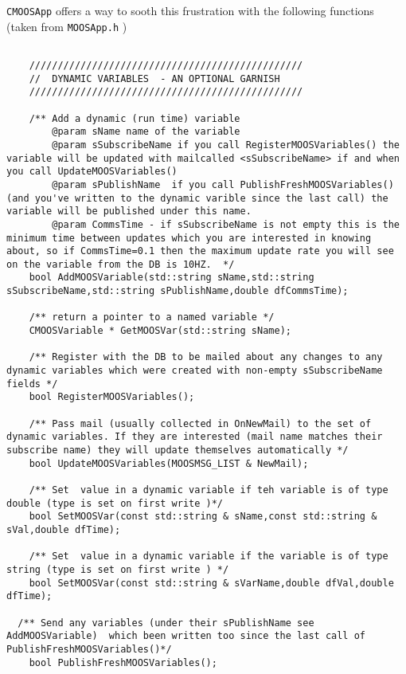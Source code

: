 \documentclass[a4paper,10pt]{article}
\newcommand{\Code}[1]{\texttt{#1} }
\newcommand{\code}[1]{\Code{#1} }
\begin{document}
\code{CMOOSApp} offers a way to sooth this frustration with the following functions (taken from \code{MOOSApp.h})

\begin{lstlisting}

    ////////////////////////////////////////////////
    //  DYNAMIC VARIABLES  - AN OPTIONAL GARNISH
    ////////////////////////////////////////////////

    /** Add a dynamic (run time) variable
        @param sName name of the variable
        @param sSubscribeName if you call RegisterMOOSVariables() the variable will be updated with mailcalled <sSubscribeName> if and when you call UpdateMOOSVariables()
        @param sPublishName  if you call PublishFreshMOOSVariables() (and you've written to the dynamic varible since the last call) the variable will be published under this name.
        @param CommsTime - if sSubscribeName is not empty this is the minimum time between updates which you are interested in knowing about, so if CommsTime=0.1 then the maximum update rate you will see on the variable from the DB is 10HZ.  */
    bool AddMOOSVariable(std::string sName,std::string sSubscribeName,std::string sPublishName,double dfCommsTime);

    /** return a pointer to a named variable */
    CMOOSVariable * GetMOOSVar(std::string sName);

    /** Register with the DB to be mailed about any changes to any dynamic variables which were created with non-empty sSubscribeName fields */
    bool RegisterMOOSVariables();
	
    /** Pass mail (usually collected in OnNewMail) to the set of dynamic variables. If they are interested (mail name matches their subscribe name) they will update themselves automatically */
    bool UpdateMOOSVariables(MOOSMSG_LIST & NewMail);

    /** Set  value in a dynamic variable if teh variable is of type double (type is set on first write )*/
    bool SetMOOSVar(const std::string & sName,const std::string & sVal,double dfTime);

    /** Set  value in a dynamic variable if the variable is of type string (type is set on first write ) */
    bool SetMOOSVar(const std::string & sVarName,double dfVal,double dfTime);

  /** Send any variables (under their sPublishName see AddMOOSVariable)  which been written too since the last call of PublishFreshMOOSVariables()*/
    bool PublishFreshMOOSVariables();
\end{lstlisting}
\end{document}
